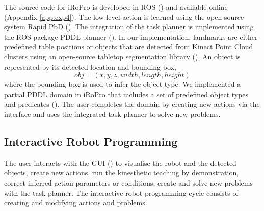 The source code for iRoPro is developed in ROS (\cite{quigley2009ros}) and available online (Appendix \ref{app:exp4}). %
The low-level action is learned using the open-source system Rapid PbD (\cite{rapidpbd}).
The integration of the task planner is implemented using the ROS package PDDL planner (\cite{pddlplanner}).
In our implementation, landmarks are either predefined table positions or 
objects that are detected from Kinect Point Cloud clusters using an open-source tabletop segmentation library (\cite{surfaceperception}).
An object is represented by its detected location and bounding box, \ie 
$$obj = (x,y,z, width, length, height)$$ 
where the bounding box is used to infer the object type.
We implemented a partial PDDL domain in iRoPro that includes a set of predefined object types and predicates ().
The user completes the domain by creating new actions via the interface and uses the integrated task planner to solve new problems.


\subsection{Interactive Robot Programming}
\label{sec:interactive}
The user interacts with the GUI () to visualise the robot and the detected objects, create new actions, run the kinesthetic teaching by demonstration, correct inferred action parameters or conditions, create and solve new problems with the task planner.
The interactive robot programming cycle consists of creating and modifying actions and problems.

